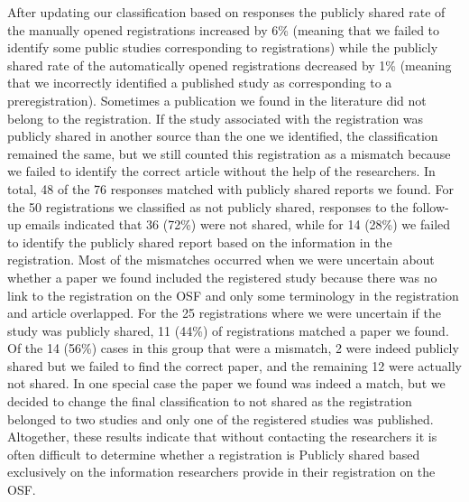 \documentclass[
  ,man, a4paper,floatsintext]{apa6}
\begin{document}
After updating our classification based on responses the publicly shared rate of the manually opened registrations increased by 6\% (meaning that we failed to identify some public studies corresponding to registrations) while the publicly shared rate of the automatically opened registrations decreased by 1\% (meaning that we incorrectly identified a published study as corresponding to a preregistration). Sometimes a publication we found in the literature did not belong to the registration. If the study associated with the registration was publicly shared in another source than the one we identified, the classification remained the same, but we still counted this registration as a mismatch because we failed to identify the correct article without the help of the researchers. In total, 48 of the 76 responses matched with publicly shared reports we found. For the 50 registrations we classified as not publicly shared, responses to the follow-up emails indicated that 36 (72\%) were not shared, while for 14 (28\%) we failed to identify the publicly shared report based on the information in the registration. Most of the mismatches occurred when we were uncertain about whether a paper we found included the registered study because there was no link to the registration on the OSF and only some terminology in the registration and article overlapped. For the 25 registrations where we were uncertain if the study was publicly shared, 11 (44\%) of registrations matched a paper we found. Of the 14 (56\%) cases in this group that were a mismatch, 2 were indeed publicly shared but we failed to find the correct paper, and the remaining 12 were actually not shared. In one special case the paper we found was indeed a match, but we decided to change the final classification to not shared as the registration belonged to two studies and only one of the registered studies was published. Altogether, these results indicate that without contacting the researchers it is often difficult to determine whether a registration is Publicly shared based exclusively on the information researchers provide in their registration on the OSF.
\end{document}
